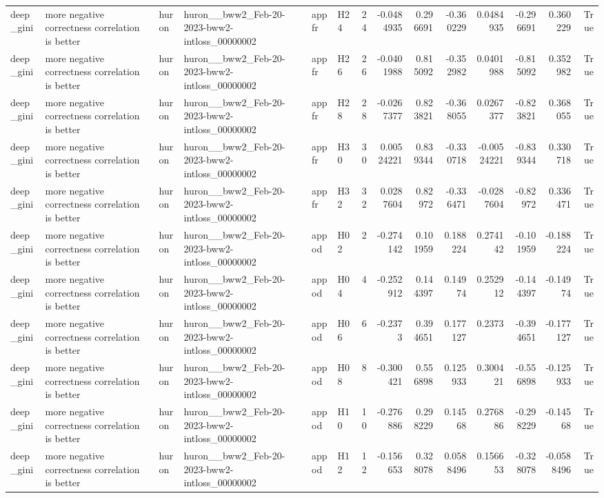\begin{longtable}{llllllrrrrrrrr}
deep\_gini & more negative correctness correlation is better & huron & huron\_\_bww2\_Feb-20-2023-bww2-intloss\_00000002 & appfr & H24 & 24 & -0.0484935 & 0.296691 & -0.360229 & 0.0484935 & -0.296691 & 0.360229 & True \\
deep\_gini & more negative correctness correlation is better & huron & huron\_\_bww2\_Feb-20-2023-bww2-intloss\_00000002 & appfr & H26 & 26 & -0.0401988 & 0.815092 & -0.352982 & 0.0401988 & -0.815092 & 0.352982 & True \\
deep\_gini & more negative correctness correlation is better & huron & huron\_\_bww2\_Feb-20-2023-bww2-intloss\_00000002 & appfr & H28 & 28 & -0.0267377 & 0.823821 & -0.368055 & 0.0267377 & -0.823821 & 0.368055 & True \\
deep\_gini & more negative correctness correlation is better & huron & huron\_\_bww2\_Feb-20-2023-bww2-intloss\_00000002 & appfr & H30 & 30 & 0.00524221 & 0.839344 & -0.330718 & -0.00524221 & -0.839344 & 0.330718 & True \\
deep\_gini & more negative correctness correlation is better & huron & huron\_\_bww2\_Feb-20-2023-bww2-intloss\_00000002 & appfr & H32 & 32 & 0.0287604 & 0.82972 & -0.336471 & -0.0287604 & -0.82972 & 0.336471 & True \\
deep\_gini & more negative correctness correlation is better & huron & huron\_\_bww2\_Feb-20-2023-bww2-intloss\_00000002 & appod & H02 & 2 & -0.274142 & 0.101959 & 0.188224 & 0.274142 & -0.101959 & -0.188224 & True \\
deep\_gini & more negative correctness correlation is better & huron & huron\_\_bww2\_Feb-20-2023-bww2-intloss\_00000002 & appod & H04 & 4 & -0.252912 & 0.144397 & 0.14974 & 0.252912 & -0.144397 & -0.14974 & True \\
deep\_gini & more negative correctness correlation is better & huron & huron\_\_bww2\_Feb-20-2023-bww2-intloss\_00000002 & appod & H06 & 6 & -0.2373 & 0.394651 & 0.177127 & 0.2373 & -0.394651 & -0.177127 & True \\
deep\_gini & more negative correctness correlation is better & huron & huron\_\_bww2\_Feb-20-2023-bww2-intloss\_00000002 & appod & H08 & 8 & -0.300421 & 0.556898 & 0.125933 & 0.300421 & -0.556898 & -0.125933 & True \\
deep\_gini & more negative correctness correlation is better & huron & huron\_\_bww2\_Feb-20-2023-bww2-intloss\_00000002 & appod & H10 & 10 & -0.276886 & 0.298229 & 0.14568 & 0.276886 & -0.298229 & -0.14568 & True \\
deep\_gini & more negative correctness correlation is better & huron & huron\_\_bww2\_Feb-20-2023-bww2-intloss\_00000002 & appod & H12 & 12 & -0.156653 & 0.328078 & 0.0588496 & 0.156653 & -0.328078 & -0.0588496 & True \\

\end{longtable}
